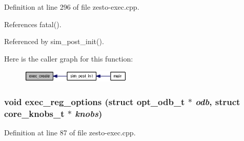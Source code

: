 Definition at line 296 of file zesto-exec.cpp.

References fatal().

Referenced by sim\_\-post\_\-init().

Here is the caller graph for this function:\nopagebreak
\begin{figure}[H]
\begin{center}
\leavevmode
\includegraphics[width=149pt]{zesto-exec_8cpp_bc3339106471b5130704c973349de0ee_icgraph}
\end{center}
\end{figure}
\subsubsection[{exec\_\-reg\_\-options}]{\setlength{\rightskip}{0pt plus 5cm}void exec\_\-reg\_\-options (struct {\bf opt\_\-odb\_\-t} $\ast$ {\em odb}, \/  struct {\bf core\_\-knobs\_\-t} $\ast$ {\em knobs})}\label{zesto-exec_8cpp_16c256815d40214f3f1d66f85b3d6598}




Definition at line 87 of file zesto-exec.cpp.

